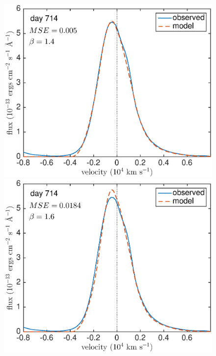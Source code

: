 \begin{figure}
\includegraphics[clip = true, scale=0.43, trim=20 0 40 0]{chapters/chapter5/images/MSE/d714_B/d714_B1_4}
\includegraphics[clip = true, scale=0.43, trim=52 0 40 0]{chapters/chapter5/images/MSE/d714_B/d714_B1_6}


\end{figure}
